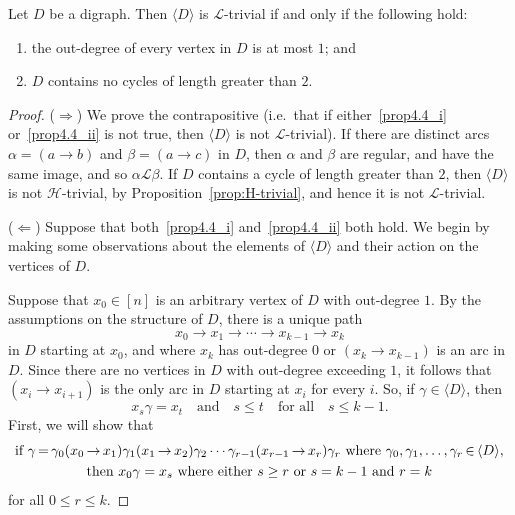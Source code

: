 \documentclass[ALCO,ThmDefs,Unicode,epreuves]{cedram}
\newcommand{\genset}[1]{\langle#1\rangle}
\newcommand{\LL}{\mathcal{L}}
\newcommand{\Hcal}{\mathcal{H}}
\newcommand{\easty}[2]{(#1 \to #2)}
\newcommand{\nset}{[n]}
\newcommand*{\Mk}{\mkern -2mu}
\begin{document}
\begin{proposition}\label{prop-l-trivial}
 Let $D$ be a digraph. Then $\genset{D}$ is $\LL$-trivial if and only if the
 following hold:
 \begin{enumerate}[(\roman*)]

 \item\label{prop4.4_i} 
 the out-degree of every vertex in $D$ is at most $1$; and

 \item\label{prop4.4_ii} 
 $D$ contains no cycles of length greater than $2$.
 \end{enumerate}
\end{proposition}
\begin{proof}
 ($\Rightarrow$) 
 We prove the contrapositive (i.e.\ that if either~\ref{prop4.4_i} or~\ref{prop4.4_ii} is not true,
 then $\genset{D}$ is not $\LL$-trivial). If there are distinct arcs $\alpha =
 (a \to b)$ and $\beta = (a\to c)$ in $D$, then $\alpha$ and $\beta$ are
 regular, and have the same image, and so $\alpha\LL\beta$. If $D$ contains a
 cycle of length greater than $2$, then $\genset{D}$ is not $\Hcal$-trivial, by
 Proposition~\ref{prop:H-trivial}, and hence it is not $\LL$-trivial.

 ($\Leftarrow$)
 Suppose that both~\ref{prop4.4_i} and~\ref{prop4.4_ii} both hold. We begin by making some
 observations about the elements of $\genset{D}$ and their action on the
 vertices of $D$.

 Suppose that $x_0 \in \nset$ is an arbitrary vertex of $D$ with
 out-degree $1$. By the assumptions on the structure of $D$, there is a
 unique path 
 \begin{equation}\label{eq:*} 
 x_0 \to x_1 \to \cdots \to x_{k-1}\to x_k 
 \end{equation} 
 in $D$ starting at $x_0$, and where $x_{k}$ has out-degree $0$ or $(x_{k}
 \to x_{k-1})$ is an arc in $D$. Since there are no vertices in $D$ with
 out-degree exceeding $1$, it follows that $(x_i \to x_{i + 1})$ is the only
 arc in $D$ starting at $x_i$ for every $i$. So, if $\gamma \in \genset{D}$,
 then 
 \begin{equation} \label{eq-1-way}
 x_s\gamma = x_t\quad\text{and}\quad s\leq t\quad \text{for all}\quad 
 s \leq k -1.
 \end{equation}
 First, we will show that 
 \begin{multline}\label{eq-2-way}
 \text{if }
 \gamma\Mk =\Mk \gamma_0\easty{x_0\Mk }{\Mk x_1}\gamma_1\easty{x_1\Mk }{\Mk x_2}\gamma_2\cdots
 \gamma_{r-1}\easty{x_{r-1}\Mk }{\Mk x_r}\gamma_r \text{ where }
 \gamma_0,\gamma_1,\ldots,\gamma_r\Mk \in \Mk \genset{D},\\
 \text{then } x_0\gamma = x_s\ 
 \text{where either}\ s\geq r\ \text{or } s = k -1\ \text{and }r = k
 \end{multline}
 for all $0\leq r\leq k$.


\end{proof}
\end{document}
